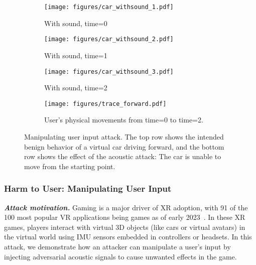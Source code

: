 \begin{figure*}[h]
\begin{minipage}{0.8\textwidth}
        \begin{subfigure}{0.3\textwidth}
            \texttt{[image: figures/car\_withsound\_1.pdf]}
            \caption{With sound, time=0}
            \label{subfig:car_withsound_frame1}
        \end{subfigure}
        \hfill
        \begin{subfigure}{0.3\textwidth}
            \texttt{[image: figures/car\_withsound\_2.pdf]}
            \caption{With sound, time=1}
            \label{subfig:car_withsound_frame2}
        \end{subfigure}
        \hfill
        \begin{subfigure}{0.3\textwidth}
            \texttt{[image: figures/car\_withsound\_3.pdf]}
            \caption{With sound, time=2}
            \label{subfig:car_withsound_frame3}
        \end{subfigure}
    \end{minipage}
    \hfill
    \begin{minipage}{0.15\textwidth}
        \centering
        \begin{subfigure}{\textwidth}
            \texttt{[image: figures/trace\_forward.pdf]}
            \vspace{-0.5cm}
            \caption{User's physical movements from time=0 to time=2.}
            \label{subfig:car_usertrace}
        \end{subfigure}
    \end{minipage}
    \caption{Manipulating user input attack. The top row shows the intended benign behavior of a virtual car driving forward, and the bottom row shows the effect of the acoustic attack: The car is unable to move from the starting point. 
    }
    \label{fig:car_game}
\end{figure*}



\subsubsection{Harm to User: Manipulating User Input}
\label{sec:app_vr_gaming}


\noindent \emph{\textbf{Attack motivation.}}
Gaming is a major driver of XR adoption, with 91 of the 100 most popular VR applications being games as of early 2023~\cite{nair2023unique}. In these XR games, players interact with virtual 3D objects (like cars or virtual avatars) in the virtual world using IMU sensors embedded in controllers or headsets. In this attack, we demonstrate how an attacker can manipulate a user’s input by injecting adversarial acoustic signals to cause unwanted effects in the game. %

